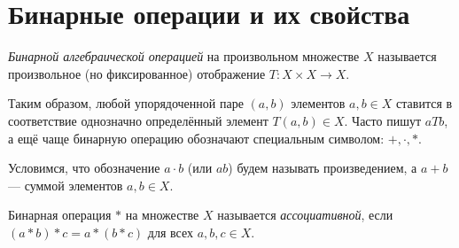 \section{Бинарные операции и их свойства}

\begin{definition}
    \textit{Бинарной алгебраической операцией} на произвольном множестве $X$ называется произвольное (но фиксированное) отображение $T:X \times X \to X$.
\end{definition}

Таким образом, любой упорядоченной паре $(a,b)$ элементов $a,b\in X$ ставится в соответствие однозначно определённый элемент $T(a,b) \in X$. Часто пишут $aTb$, а ещё чаще бинарную операцию обозначают специальным символом: $+, \cdot, *$.

Условимся, что обозначение $a\cdot b$ (или $ab$) будем называть произведением, а $a+b$ --- суммой элементов $a,b \in X$.

\begin{definition}
    Бинарная операция $*$ на множестве $X$ называется \textit{ассоциативной}, если $(a*b)*c=a*(b*c)$ для всех $a,b,c \in X$.
\end{definition}


